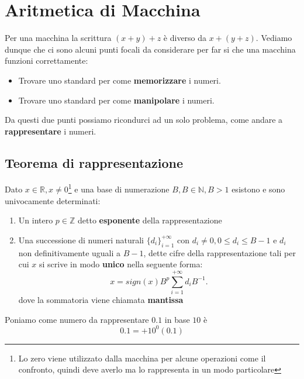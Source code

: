 \section{Aritmetica di Macchina}
Per una macchina la scrittura $(x + y) + z$ è diverso da $x + (y + z)$. Vediamo dunque che ci sono alcuni punti focali da considerare per far si che una macchina funzioni correttamente:

\begin{itemize}
    \item Trovare uno standard per come \textbf{memorizzare} i numeri.
    \item Trovare uno standard per come \textbf{manipolare} i numeri.
\end{itemize}

\noindent Da questi due punti possiamo ricondurci ad un solo problema, come andare a \textbf{rappresentare} i numeri.

\subsection{Teorema di rappresentazione}
\begin{theorem}
    Dato $x \in \mathbb{R}, x \neq 0$\footnote{Lo zero viene utilizzato dalla macchina per alcune operazioni come il confronto, quindi deve averlo ma lo rappresenta in un modo particolare} e una base di numerazione $B, B\in \mathbb{N}, B>1$ esistono e sono univocamente determinati:
    \begin{enumerate}
        \item Un intero $p \in \mathbb{Z}$ detto \textbf{esponente} della rappresentazione
        \item Una successione di numeri naturali $\{d_i\}_{i=1}^{+\infty}$ con $d_i \neq 0, 0 \leq d_i \leq B - 1$ e $d_i$
        non definitivamente uguali a \(B - 1\), dette cifre della rappresentazione tali per cui $x$ si scrive in modo \textbf{unico} nella seguente forma:
        \begin{equation}
        	x = sign(x)B^p \sum_{i=1}^{+\infty}d_i B^{-1}.
        \end{equation}
        dove la sommatoria viene chiamata \textbf{mantissa}
    \end{enumerate}   
\end{theorem}

\begin{example}
	Poniamo come numero da rappresentare $0.1$ in base $10$ è
	\begin{equation*}
		0.1 = +10^0(0.1)
	\end{equation*}
\end{example}

